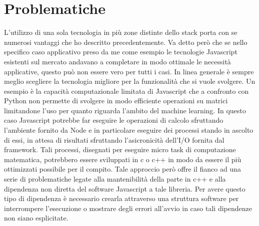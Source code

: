 \section{Problematiche}
\vspace{5mm}L'utilizzo di una sola tecnologia in più zone distinte dello stack porta con se numerosi vantaggi che ho descritto precedentemente. Va detto però che se nello specifico caso applicativo preso da me come esempio le tecnologie Javascript esistenti sul mercato andavano a completare in modo ottimale le necessità applicative, questo può non essere vero per tutti i casi. In linea generale è sempre meglio scegliere la tecnologia migliore per la funzionalità che si vuole svolgere. Un esempio è la capacità computazionale limitata di Javascript che a confronto con Python non permette di svolgere in modo efficiente operazioni su matrici limitandone l'uso per quanto riguarda l'ambito del machine learning. In questo caso Javascript potrebbe far eseguire le operazioni di calcolo sfruttando l'ambiente fornito da Node e in particolare eseguire dei processi stando in ascolto di essi, in attesa di risultati sfruttando l'asicronicità dell'I/O fornita dal framework. Tali processi, disegnati per eseguire micro task di computazione matematica, potrebbero essere sviluppati in c o c++ in modo da essere il più ottimizzati possibile per il compito. Tale approccio però offre il fianco ad una serie di problematiche legate alla mantenibilità della parte in c++ e alla dipendenza non diretta del software Javascript a tale libreria. Per avere questo tipo di dipendenza è necessario crearla attraverso una struttura software per interrompere l'esecuzione o mostrare degli errori all'avvio in caso tali dipendenze non siano esplicitate.
